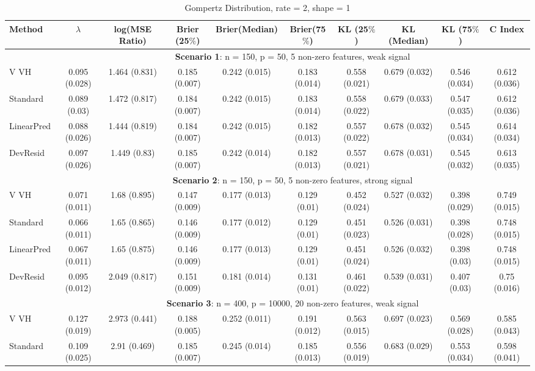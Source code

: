 \documentclass{article}
\begin{document}
\begin{landscape}
\begin{table}[h]
\caption{\label{Tab:sim} Gompertz Distribution, rate = 2, shape = 1}
\centering
\begin{tabular}[t]{lccccccccc}
\toprule
 Method & $\lambda$ & log(MSE Ratio) & Brier (25$\%$) & Brier(Median) & Brier(75$\%$) & KL (25$\%$)& KL (Median) & KL (75$\%$) & C Index\\
\midrule
&\multicolumn{9}{c}{\textbf{Scenario 1}: n = 150, p = 50, 5 non-zero features, weak signal}\\
\cline{2-10}
V VH  & 0.095 (0.028) & 1.464 (0.831) & 0.185 (0.007) & 0.242 (0.015) & 0.183 (0.014) & 0.558 (0.021) & 0.679 (0.032) & 0.546 (0.034) & 0.612 (0.036) \\
Standard  & 0.089 (0.03) & 1.472 (0.817) & 0.184 (0.007) & 0.242 (0.015) & 0.183 (0.014) & 0.558 (0.022) & 0.679 (0.033) & 0.547 (0.035) & 0.612 (0.036) \\
LinearPred  & 0.088 (0.026) & 1.444 (0.819) & 0.184 (0.007) & 0.242 (0.015) & 0.182 (0.013) & 0.557 (0.022) & 0.678 (0.032) & 0.545 (0.034) & 0.614 (0.034) \\
DevResid  & 0.097 (0.026) & 1.449 (0.83) & 0.185 (0.007) & 0.242 (0.014) & 0.182 (0.013) & 0.557 (0.021) & 0.678 (0.031) & 0.545 (0.032) & 0.613 (0.035) \\
\addlinespace
&\multicolumn{9}{c}{\textbf{Scenario 2}: n = 150, p = 50, 5 non-zero features, strong signal}\\
\cline{2-10}
V VH  & 0.071 (0.011) & 1.68 (0.895) & 0.147 (0.009) & 0.177 (0.013) & 0.129 (0.01) & 0.452 (0.024) & 0.527 (0.032) & 0.398 (0.029) & 0.749 (0.015) \\ 
Standard  & 0.066 (0.011) & 1.65 (0.865) & 0.146 (0.009) & 0.177 (0.012) & 0.129 (0.01) & 0.451 (0.023) & 0.526 (0.031) & 0.398 (0.028) & 0.748 (0.015) \\ 
LinearPred  & 0.067 (0.011) & 1.65 (0.875) & 0.146 (0.009) & 0.177 (0.013) & 0.129 (0.01) & 0.451 (0.024) & 0.526 (0.032) & 0.398 (0.03) & 0.748 (0.015) \\
 DevResid  & 0.095 (0.012) & 2.049 (0.817) & 0.151 (0.009) & 0.181 (0.014) & 0.131 (0.01) & 0.461 (0.022) & 0.539 (0.031) & 0.407 (0.03) & 0.75 (0.016) \\
\addlinespace
&\multicolumn{9}{c}{\textbf{Scenario 3}: n = 400, p = 10000, 20 non-zero features, weak signal}\\
\cline{2-10}
V VH  & 0.127 (0.019) & 2.973 (0.441) & 0.188 (0.005) & 0.252 (0.011) & 0.191 (0.012) & 0.563 (0.015) & 0.697 (0.023) & 0.569 (0.028) & 0.585 (0.043) \\ 
Standard  & 0.109 (0.025) & 2.91 (0.469) & 0.185 (0.007) & 0.245 (0.014) & 0.185 (0.013) & 0.556 (0.019) & 0.683 (0.029) & 0.553 (0.034) & 0.598 (0.041) \\

\end{tabular}
\end{table}
\end{landscape}
\end{document}
